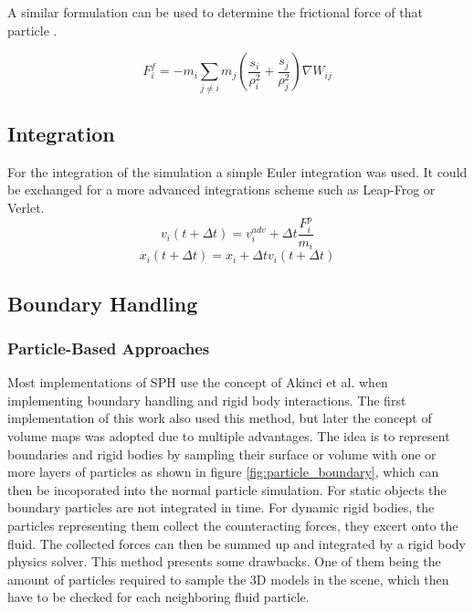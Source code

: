 \documentclass[intern]{cgMA}
\begin{document}
    A similar formulation can be used to determine the frictional force of that particle \cite{10.2312:PE:vriphys:vriphys12:053-060}.

    \begin{equation}
        F_i^f = -m_i \sum_{j \neq i} m_j (\frac{s_i}{\rho_i^2} + \frac{s_j}{\rho_j^2})  \nabla W_{ij}
    \end{equation}

    

    \subsection{Integration}
    For the integration of the simulation a simple Euler integration was used. It could be exchanged for a more advanced integrations scheme such as Leap-Frog or Verlet.
    \begin{equation}
        v_i(t + \Delta t) = v_i^{adv} + \Delta t \frac{F_i^p}{m_i}
    \end{equation}
    \begin{equation}
        x_i(t + \Delta t) = x_i + \Delta t v_i(t + \Delta t)
    \end{equation}

    \subsection{Boundary Handling}
    
    \subsubsection*{Particle-Based Approaches}
    Most implementations of SPH use the concept of Akinci et al. \cite{boundary_handling} when implementing boundary handling and rigid body interactions. The first implementation of this work also used this method, but later the concept of volume maps was adopted due to multiple advantages. The idea is to represent boundaries and rigid bodies by sampling their surface or volume with one or more layers of particles as shown in figure \ref{fig:particle_boundary}, which can then be incoporated into the normal particle simulation. For static objects the boundary particles are not integrated in time. For dynamic rigid bodies, the particles representing them collect the counteracting forces, they excert onto the fluid. The collected forces can then be summed up and integrated by a rigid body physics solver.
    This method presents some drawbacks. One of them being the amount of particles required to sample the 3D models in the scene, which then have to be checked for each neighboring fluid particle. \cite{10.1145/3359566.3360077} \cite{10.2312:PE:vriphys:vriphys12:053-060} \cite{boundary_handling} \cite{10.1145/2185520.2185558}
\end{document}

